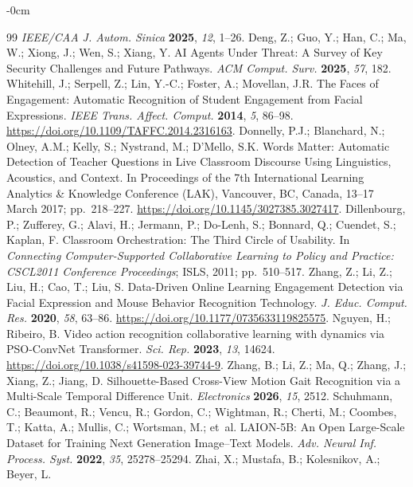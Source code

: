 \documentclass[symmetry,article,submit,pdftex,moreauthors]{Definitions/mdpi}
\begin{document}
\begin{adjustwidth}{-\extralength}{0cm}
\begin{thebibliography}{99}
\textit{IEEE/CAA J. Autom. Sinica} \textbf{2025}, \textit{12}, 1--26.
 Deng, Z.; Guo, Y.; Han, C.; Ma, W.; Xiong, J.; Wen, S.; Xiang, Y.
AI Agents Under Threat: A Survey of Key Security Challenges and Future Pathways.
\textit{ACM Comput. Surv.} \textbf{2025}, \textit{57}, 182.
 Whitehill, J.; Serpell, Z.; Lin, Y.-C.; Foster, A.; Movellan, J.R.
The Faces of Engagement: Automatic Recognition of Student Engagement from Facial Expressions.
\textit{IEEE Trans. Affect. Comput.} \textbf{2014}, \textit{5}, 86--98. \url{https://doi.org/10.1109/TAFFC.2014.2316163}.
 Donnelly, P.J.; Blanchard, N.; Olney, A.M.; Kelly, S.; Nystrand, M.; D'Mello, S.K.
Words Matter: Automatic Detection of Teacher Questions in Live Classroom Discourse Using Linguistics, Acoustics, and Context.
In Proceedings of the 7th International Learning Analytics \& Knowledge Conference (LAK), Vancouver, BC, Canada, 13--17 March 2017; pp.~218--227. \url{https://doi.org/10.1145/3027385.3027417}.
 Dillenbourg, P.; Zufferey, G.; Alavi, H.; Jermann, P.; Do-Lenh, S.; Bonnard, Q.; Cuendet, S.; Kaplan, F.
Classroom Orchestration: The Third Circle of Usability.
In \textit{Connecting Computer-Supported Collaborative Learning to Policy and Practice: CSCL2011 Conference Proceedings}; ISLS, 2011; pp.~510--517.
 Zhang, Z.; Li, Z.; Liu, H.; Cao, T.; Liu, S.
Data-Driven Online Learning Engagement Detection via Facial Expression and Mouse Behavior Recognition Technology.
\textit{J. Educ. Comput. Res.} \textbf{2020}, \textit{58}, 63--86. \url{https://doi.org/10.1177/0735633119825575}.
 Nguyen, H.; Ribeiro, B.
Video action recognition collaborative learning with dynamics via PSO-ConvNet Transformer.
\textit{Sci. Rep.} \textbf{2023}, \textit{13}, 14624. \url{https://doi.org/10.1038/s41598-023-39744-9}.
 Zhang, B.; Li, Z.; Ma, Q.; Zhang, J.; Xiang, Z.; Jiang, D.
Silhouette-Based Cross-View Motion Gait Recognition via a Multi-Scale Temporal Difference Unit.
\textit{Electronics} \textbf{2026}, \textit{15}, 2512.
 Schuhmann, C.; Beaumont, R.; Vencu, R.; Gordon, C.; Wightman, R.; Cherti, M.; Coombes, T.; Katta, A.; Mullis, C.; Wortsman, M.; et~al.
LAION-5B: An Open Large-Scale Dataset for Training Next Generation Image--Text Models.
\textit{Adv. Neural Inf. Process. Syst.} \textbf{2022}, \textit{35}, 25278--25294.
 Zhai, X.; Mustafa, B.; Kolesnikov, A.; Beyer, L.

\end{thebibliography}
\end{adjustwidth}
\end{document}
